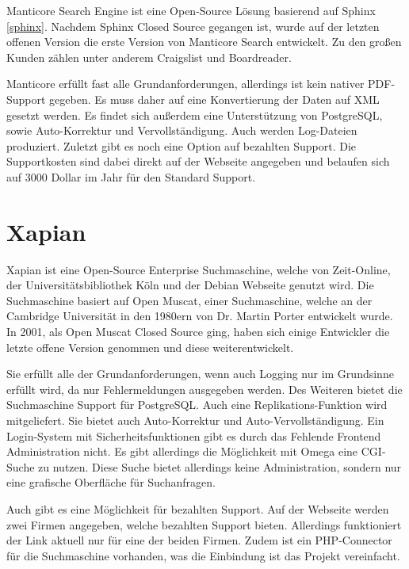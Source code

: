 Manticore Search Engine ist eine Open-Source Lösung basierend auf Sphinx \ref{sphinx}. Nachdem Sphinx Closed Source gegangen ist, wurde auf der letzten offenen Version die erste Version von Manticore Search entwickelt. Zu den großen Kunden zählen unter anderem Craigslist und Boardreader.

Manticore erfüllt fast alle Grundanforderungen, allerdings ist kein nativer PDF-Support gegeben. Es muss daher auf eine Konvertierung der Daten auf XML gesetzt werden. Es findet sich außerdem eine Unterstützung von PostgreSQL, sowie Auto-Korrektur und Vervollständigung. Auch werden Log-Dateien produziert. Zuletzt gibt es noch eine Option auf bezahlten Support. Die Supportkosten sind dabei direkt auf der Webseite angegeben und belaufen sich auf 3000 Dollar im Jahr für den Standard Support. \cite{ManticoreSoftwareLtd.2019}

\section{Xapian}
\label{xapian}

Xapian ist eine Open-Source Enterprise Suchmaschine, welche von Zeit-Online, der Universitätsbibliothek Köln und der Debian Webseite genutzt wird. Die Suchmaschine basiert auf Open Muscat, einer Suchmaschine, welche an der Cambridge Universität in den 1980ern von Dr. Martin Porter entwickelt wurde. In 2001, als Open Muscat Closed Source ging, haben sich einige Entwickler die letzte offene Version genommen und diese weiterentwickelt.

Sie erfüllt alle der Grundanforderungen, wenn auch Logging nur im Grundsinne erfüllt wird, da nur Fehlermeldungen ausgegeben werden. Des Weiteren bietet die Suchmaschine Support für PostgreSQL. Auch eine Replikations-Funktion wird mitgeliefert. Sie bietet auch Auto-Korrektur und Auto-Vervollständigung. Ein Login-System mit Sicherheitsfunktionen gibt es durch das Fehlende Frontend Administration nicht. Es gibt allerdings die Möglichkeit mit Omega eine CGI-Suche zu nutzen. Diese Suche bietet allerdings keine Administration, sondern nur eine grafische Oberfläche für Suchanfragen.

Auch gibt es eine Möglichkeit für bezahlten Support. Auf der Webseite werden zwei Firmen angegeben, welche bezahlten Support bieten. Allerdings funktioniert der Link aktuell nur für eine der beiden Firmen. Zudem ist ein PHP-Connector für die Suchmaschine vorhanden, was die Einbindung ist das Projekt vereinfacht. \cite{XAP.2019}

